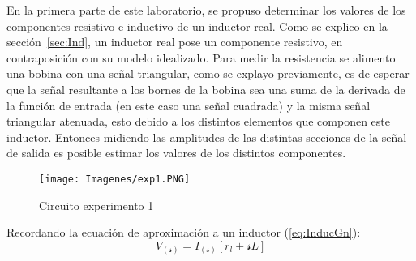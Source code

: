 \label{sec:exp1}
En la primera parte de este laboratorio, se propuso determinar los valores de los componentes resistivo e inductivo de un inductor real. Como se explico en la sección~\ref{sec:Ind}, un inductor real pose un componente resistivo, en contraposición con su modelo idealizado. Para medir la resistencia se alimento una bobina con una señal triangular, como se explayo previamente, es de esperar que la señal resultante a los bornes de la bobina sea una suma de la derivada de la función de entrada (en este caso una señal cuadrada) y la misma señal triangular atenuada, esto debido a los distintos elementos que componen este inductor. Entonces midiendo las amplitudes de las distintas secciones de la señal de salida es posible estimar los valores de los distintos componentes.

\begin{figure}[H]
    \centering
    \texttt{[image: Imagenes/exp1.PNG]}
    \caption{Circuito experimento 1}
    \label{fig:exp1}
\end{figure}

Recordando la ecuación de aproximación a un inductor (\ref{eq:InducGn}):
\begin{equation*}
    V_{(\mathscr{s})}=I_{(\mathscr{s})}[r_l+\mathscr{s}L]
\end{equation*}


